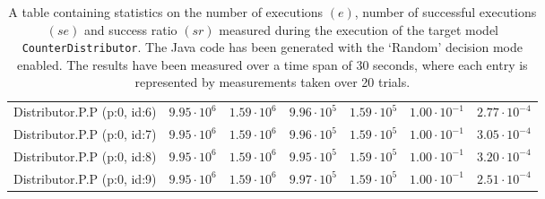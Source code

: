 \begin{table}[htbp]
{\begin{tabular}{lrrrrrr}
\hspace{3mm}Distributor.P.P (p:0, id:6) & $9.95 \cdot 10^{6}$ & $1.59 \cdot 10^{6}$ & $9.96 \cdot 10^{5}$ & $1.59 \cdot 10^{5}$ & $1.00 \cdot 10^{-1}$ & $2.77 \cdot 10^{-4}$ \\
\hspace{3mm}Distributor.P.P (p:0, id:7) & $9.95 \cdot 10^{6}$ & $1.59 \cdot 10^{6}$ & $9.96 \cdot 10^{5}$ & $1.59 \cdot 10^{5}$ & $1.00 \cdot 10^{-1}$ & $3.05 \cdot 10^{-4}$ \\
\hspace{3mm}Distributor.P.P (p:0, id:8) & $9.95 \cdot 10^{6}$ & $1.59 \cdot 10^{6}$ & $9.95 \cdot 10^{5}$ & $1.59 \cdot 10^{5}$ & $1.00 \cdot 10^{-1}$ & $3.20 \cdot 10^{-4}$ \\
\hspace{3mm}Distributor.P.P (p:0, id:9) & $9.95 \cdot 10^{6}$ & $1.59 \cdot 10^{6}$ & $9.97 \cdot 10^{5}$ & $1.59 \cdot 10^{5}$ & $1.00 \cdot 10^{-1}$ & $2.51 \cdot 10^{-4}$ \\
\bottomrule
\end{tabular}
}
\caption{A table containing statistics on the number of executions $(e)$, number of successful executions $(se)$ and success ratio $(sr)$ measured during the execution of the target model \texttt{CounterDistributor}. The Java code has been generated with the `Random' decision mode enabled. The results have been measured over a time span of 30 seconds, where each entry is represented by measurements taken over 20 trials.}
\label{table:frequency_results_counterdistributor_random}
\end{table}